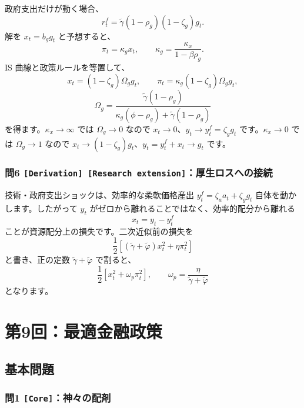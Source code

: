 \documentclass[
  japanese,
  lualatex,
  ja=standard,
  11pt,
  a4paper]{ltjsarticle}
\begin{document}
政府支出だけが動く場合、 \[
r_t^f=\widetilde\gamma(1-\rho_g)(1-\zeta_g)g_t.
\] 解を \(x_t=b_gg_t\) と予想すると、 \[
\pi_t=\kappa_gx_t,
\qquad
\kappa_g=\frac{\kappa_x}{1-\beta\rho_g}.
\] IS 曲線と政策ルールを等置して、 \[
x_t=(1-\zeta_g)\Omega_gg_t,
\qquad
\pi_t=\kappa_g(1-\zeta_g)\Omega_gg_t,
\] \[
\Omega_g
=\frac{\widetilde\gamma(1-\rho_g)}
{\kappa_g(\phi-\rho_g)+\widetilde\gamma(1-\rho_g)}
\] を得ます。\(\kappa_x\to\infty\) では \(\Omega_g\to0\) なので
\(x_t\to0\)、\(y_t\to y_t^f=\zeta_gg_t\) です。\(\kappa_x\to0\) では
\(\Omega_g\to1\) なので
\(x_t\to(1-\zeta_g)g_t\)、\(y_t=y_t^f+x_t\to g_t\) です。

\subsubsection{\texorpdfstring{問6
\texttt{{[}Derivation{]}\ {[}Research\ extension{]}}：厚生ロスへの接続}{問6 {[}Derivation{]} {[}Research extension{]}：厚生ロスへの接続}}\label{ux554f6-derivation-research-extensionux539aux751fux30edux30b9ux3078ux306eux63a5ux7d9a}

技術・政府支出ショックは、効率的な柔軟価格産出
\(y_t^f=\zeta_aa_t+\zeta_gg_t\) 自体を動かします。したがって \(y_t\)
がゼロから離れることではなく、効率的配分から離れる \[
x_t=y_t-y_t^f
\] ことが資源配分上の損失です。二次近似前の損失を \[
\frac12\left[(\widetilde\gamma+\widetilde\varphi)x_t^2
+\eta\pi_t^2\right]
\] と書き、正の定数 \(\widetilde\gamma+\widetilde\varphi\) で割ると、 \[
\frac12\left[x_t^2+\omega_p\pi_t^2\right],
\qquad
\omega_p=\frac{\eta}{\widetilde\gamma+\widetilde\varphi}
\] となります。

\clearpage

\section{第9回：最適金融政策}\label{ux7b2c9ux56deux6700ux9069ux91d1ux878dux653fux7b56}

\subsection{基本問題}\label{ux57faux672cux554fux984c-8}

\subsubsection{\texorpdfstring{問1
\texttt{{[}Core{]}}：神々の配剤}{問1 {[}Core{]}：神々の配剤}}\label{ux554f1-coreux795eux3005ux306eux914dux5264}
\end{document}

